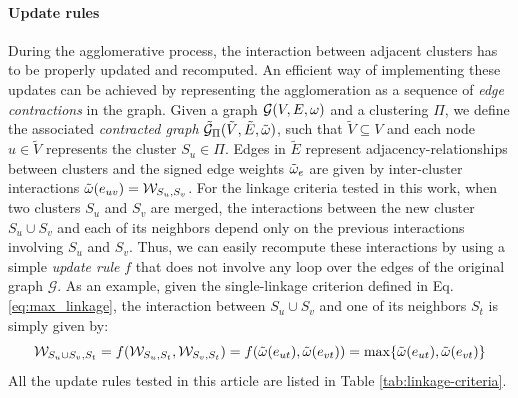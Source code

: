 \paragraph{Update rules} During the agglomerative process, the interaction between adjacent clusters has to be properly updated and recomputed.  %
An efficient way of implementing these updates can be achieved by representing the agglomeration as a sequence of \emph{edge contractions} in the graph. Given a graph $\mathcal{G}(V,E,\omega)$ and a clustering $\Pi$, we define the associated \emph{contracted graph} $\tilde{\mathcal{G}}_\Pi(\tilde{V}, \tilde{E}, \tilde{\omega})$, such that $\tilde{V} \subseteq V$ and each node $u\in \tilde{V}$ represents the cluster $S_u \in \Pi$. Edges in $\tilde{E}$ represent adjacency-relationships between clusters and the signed edge weights $\tilde{\omega}_e$ are given by inter-cluster interactions $\tilde{\omega}(e_{uv})=\mathcal{W}_{S_u,S_v}$. 
For the linkage criteria tested in this work, when two clusters $S_u$ and $S_v$ are merged, the interactions between the new cluster $S_u \cup S_v$ and each of its neighbors depend only on the previous interactions involving $S_u$ and $S_v$. Thus, we can easily recompute these interactions by using a simple \emph{update rule} $f$ that does not involve any loop over the edges of the original graph $\mathcal{G}$. As an example, given the single-linkage criterion defined in Eq. \ref{eq:max_linkage}, the interaction between $S_u \cup S_v$ and one of its neighbors $S_t$ is simply given by:
\begin{equation}
  \mathcal{W}_{S_u \cup S_v,S_t} = f( \mathcal{W}_{S_u,S_t}, \mathcal{W}_{S_v,S_t}) = f(\tilde{\omega}(e_{ut}), \tilde{\omega}(e_{vt})) = \max \{ \tilde{\omega}(e_{ut}), \tilde{\omega}(e_{vt}) \}
\end{equation}
All the update rules tested in this article are listed in Table \ref{tab:linkage-criteria}.

